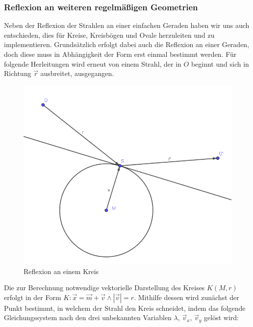 \documentclass[reducespace,stylepage,semiarbeit]{spezidoc}
\begin{document}
\subsubsection{Reflexion an weiteren regelmäßigen Geometrien}
Neben der Reflexion der Strahlen an einer einfachen Geraden haben wir uns auch entschieden, dies für Kreise, Kreisbögen und Ovale herzuleiten und zu implementieren. 
Grundsätzlich erfolgt dabei auch die Reflexion an einer Geraden, doch diese muss in Abhängigkeit der Form erst einmal bestimmt werden. 
Für folgende Herleitungen wird erneut von einem Strahl, der in $O$ beginnt und sich in Richtung $\vec{r}$ ausbreitet, ausgegangen.
\newpage
\begin{figure}
\includegraphics[scale=0.5]{pictures/CircleRef.png}
\caption{Reflexion an einem Kreis}
\end{figure}
Die zur Berechnung notwendige vektorielle Darstellung des Kreises $K(M, r)$ erfolgt in der Form $K: \vec{x} = \vec{m} + \vec{v} \wedge |\vec{v}| = r$.
Mithilfe dessen wird zunächst der Punkt bestimmt, in welchem der Strahl den Kreis schneidet, indem das folgende Gleichungssystem nach den drei unbekannten Variablen $\lambda$, $\vec{v}_x$, $\vec{v}_y$ gelöst wird:
\end{document}
